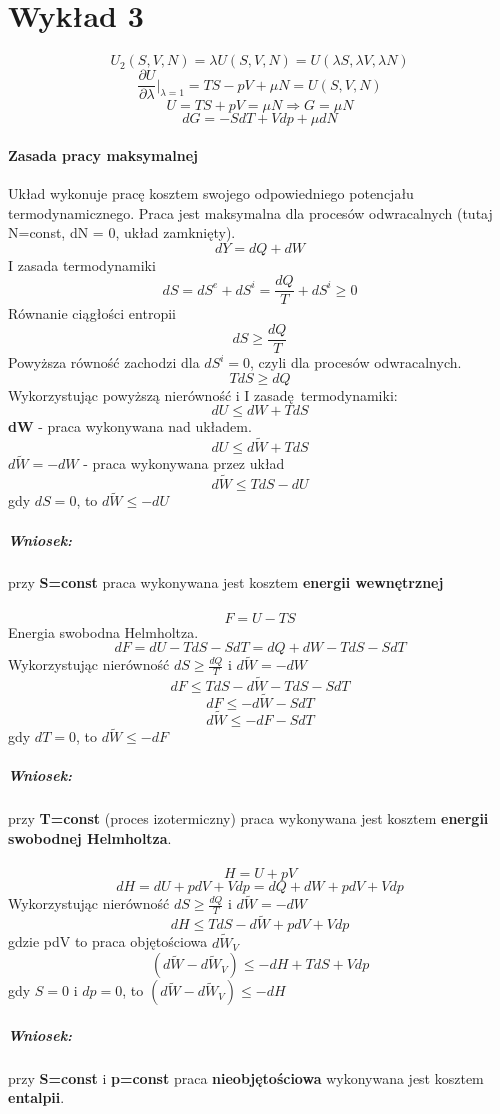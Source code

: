 \documentclass{article}
\begin{document}
	\section{Wykład 3}
		$$U_2(S,V,N) = \lambda U(S,V,N) = U(\lambda S, \lambda V, \lambda N)$$
		$$\frac{\partial U}{\partial \lambda} \Big |_{\lambda = 1} = TS - pV + \mu N = U(S,V,N)$$
		$$U = TS + pV = \mu N \Rightarrow G = \mu N$$
		$$dG = -SdT + Vdp + \mu dN$$
		\paragraph{Zasada pracy maksymalnej} Układ wykonuje pracę kosztem swojego odpowiedniego potencjału termodynamicznego. Praca jest maksymalna dla procesów odwracalnych (tutaj N=const, dN = 0, układ zamknięty).
		$$dY = dQ + dW$$
		I zasada termodynamiki
		$$dS = dS^e + dS^i = \frac{dQ}{T} + dS^i \geqslant 0$$			
		Równanie ciągłości entropii
		$$dS \geqslant \frac{dQ}{T}$$
		Powyższa równość zachodzi dla $dS^i = 0$, czyli dla procesów odwracalnych.
		$$TdS \geqslant dQ$$
		Wykorzystując powyższą nierówność i I zasadę termodynamiki:
		$$dU \leqslant dW + TdS$$
		\textbf{dW} - praca wykonywana nad układem.
		$$dU \leqslant d \widetilde{W} + TdS$$
		$d\widetilde{W} = -dW$ - praca wykonywana przez układ
		$$d\widetilde{W} \leqslant TdS - dU$$
		gdy $dS = 0$, to $d\widetilde{W} \leqslant -dU$
		\subparagraph{Wniosek:} przy \textbf{S=const} praca wykonywana jest kosztem \textbf{energii wewnętrznej}
		\paragraph{}
		$$F = U - TS$$
		Energia swobodna Helmholtza.
		$$dF = dU - TdS - SdT = dQ + dW - TdS - SdT$$
		Wykorzystując nierówność $dS \geqslant \frac{dQ}{T}$ i $d\widetilde{W} = -dW$
		$$dF \leqslant TdS - d\widetilde{W} - TdS - SdT$$
		$$dF \leqslant -d\widetilde{W} - SdT$$
		$$d \widetilde{W} \leqslant -dF -SdT$$
		gdy $dT = 0$, to $d\widetilde{W} \leqslant -dF$
		\subparagraph{Wniosek:} przy \textbf{T=const} (proces izotermiczny) praca wykonywana jest kosztem \textbf{energii swobodnej Helmholtza}.
		\paragraph{}
		$$H = U + pV$$
		$$dH = dU + pdV + Vdp = dQ + dW + pdV + Vdp$$
		Wykorzystując nierówność $dS \geqslant \frac{dQ}{T}$ i $d\widetilde{W} = -dW$
		$$dH \leqslant TdS - d \widetilde{W} + pdV + Vdp$$
		gdzie pdV to praca objętościowa $d\widetilde{W}_V$
		$$(d\widetilde{W} - d\widetilde{W}_V) \leqslant -dH + TdS + Vdp$$
		gdy $S = 0$ i $dp = 0$, to $(d\widetilde{W} - d\widetilde{W}_V) \leqslant -dH$
		\subparagraph{Wniosek:} przy \textbf{S=const} i \textbf{p=const} praca \textbf{nieobjętościowa} wykonywana jest kosztem \textbf{entalpii}. 
\end{document}
